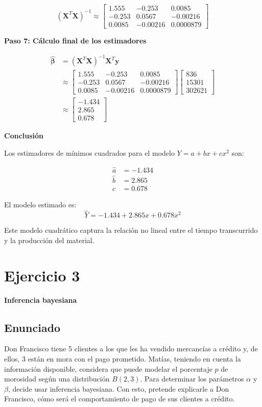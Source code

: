 \documentclass[11pt,a4paper]{article}
\begin{document}
\[
(\mathbf{X}^T\mathbf{X})^{-1} \approx \begin{bmatrix}
1.555 & -0.253 & 0.0085 \\
-0.253 & 0.0567 & -0.00216 \\
0.0085 & -0.00216 & 0.0000879
\end{bmatrix}
\]

\textbf{Paso 7: Cálculo final de los estimadores}

\begin{align*}
\hat{\boldsymbol{\beta}} &= (\mathbf{X}^T\mathbf{X})^{-1}\mathbf{X}^T\mathbf{y} \\
&\approx \begin{bmatrix} 1.555 & -0.253 & 0.0085 \\ -0.253 & 0.0567 & -0.00216 \\ 0.0085 & -0.00216 & 0.0000879 \end{bmatrix} \begin{bmatrix} 836 \\ 15301 \\ 302621 \end{bmatrix} \\
&\approx \begin{bmatrix} -1.434 \\ 2.865 \\ 0.678 \end{bmatrix}
\end{align*}



\textbf{Conclusión}

Los estimadores de mínimos cuadrados para el modelo $Y = a + bx + cx^2$ son:

\[
\boxed{
\begin{aligned}
\hat{a} &= -1.434 \\
\hat{b} &= 2.865 \\
\hat{c} &= 0.678
\end{aligned}
}
\]

El modelo estimado es:
\[
\hat{Y} = -1.434 + 2.865x + 0.678x^2
\]

Este modelo cuadrático captura la relación no lineal entre el tiempo transcurrido y la producción del material.

\section{Ejercicio 3}
\textbf{Inferencia bayesiana}

\subsection{Enunciado}
Don Francisco tiene 5 clientes a los que les ha vendido mercancías a crédito y, de ellos, 3 están en mora con el pago prometido. Matías, teniendo en cuenta la información disponible, considera que puede modelar el porcentaje $p$ de morosidad según una distribución $B(2, 3)$. Para determinar los parámetros $\alpha$ y $\beta$, decide usar inferencia bayesiana. Con esto, pretende explicarle a Don Francisco, cómo será el comportamiento de pago de sus clientes a crédito. 
\end{document}
